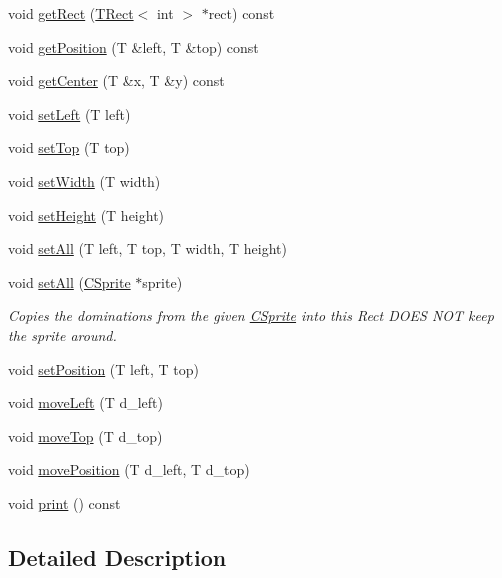 \begin{DoxyCompactItemize}
\item 
void \hyperlink{classengine_1_1TRect_a9b563983bf2839c51db741cdd0b90058}{get\-Rect} (\hyperlink{classengine_1_1TRect}{T\-Rect}$<$ int $>$ $\ast$rect) const 
\item 
void \hyperlink{classengine_1_1TRect_a6ec7dc08118c6012d17327ca8934d2e0}{get\-Position} (T \&left, T \&top) const 
\item 
void \hyperlink{classengine_1_1TRect_a34c390356af6890b4d4a5ef3d19694cf}{get\-Center} (T \&x, T \&y) const 
\item 
void \hyperlink{classengine_1_1TRect_aa0f1c4e8042c553fb3a9ad0805a58bb3}{set\-Left} (T left)
\item 
void \hyperlink{classengine_1_1TRect_aca4664e0e6d9736ffbc48663f9e8cd3f}{set\-Top} (T top)
\item 
void \hyperlink{classengine_1_1TRect_aad5a2530169d7953634fea4515381c37}{set\-Width} (T width)
\item 
void \hyperlink{classengine_1_1TRect_ae29fe9d2401f49e84f6c070ef60e9d7b}{set\-Height} (T height)
\item 
void \hyperlink{classengine_1_1TRect_ae10bacc96b54c45b2722e51b045ae3fe}{set\-All} (T left, T top, T width, T height)
\item 
void \hyperlink{classengine_1_1TRect_a41cce51fffc829c4d3e5dc40f605cb9e}{set\-All} (\hyperlink{classCSprite}{C\-Sprite} $\ast$sprite)
\begin{DoxyCompactList}\small\item\em Copies the dominations from the given \hyperlink{classCSprite}{C\-Sprite} into this Rect D\-O\-E\-S N\-O\-T keep the sprite around. \end{DoxyCompactList}\item 
void \hyperlink{classengine_1_1TRect_ad7bdff230a7152e3d8ed3934046bed7c}{set\-Position} (T left, T top)
\item 
void \hyperlink{classengine_1_1TRect_a0699fb896f494a85e24abe32066ae5d9}{move\-Left} (T d\-\_\-left)
\item 
void \hyperlink{classengine_1_1TRect_a7e65ccfa166f4d7690d87e6985182379}{move\-Top} (T d\-\_\-top)
\item 
void \hyperlink{classengine_1_1TRect_a2650390138117e0ad1eecc8124735bd9}{move\-Position} (T d\-\_\-left, T d\-\_\-top)
\item 
void \hyperlink{classengine_1_1TRect_af15d2e6daff9f908dbd3d486d2349883}{print} () const 
\end{DoxyCompactItemize}


\subsection{Detailed Description}

